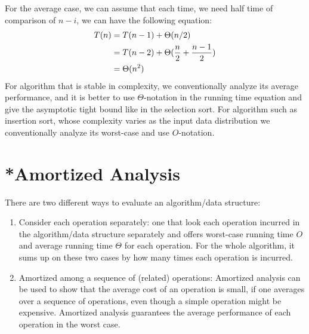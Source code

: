 \documentclass[../main.tex]{subfiles}
\begin{document}
For the average case, we can assume that each time, we need half time of comparison of $n-i$, we can have the following equation:
\begin{align}
    T(n)&=T(n-1)+\Theta(n/2)\\
    &=T(n-2)+\Theta(\frac{n}{2}+\frac{n-1}{2}) \notag\\
    &=\Theta(n^2)\notag
\end{align}
For algorithm that is stable in complexity, we conventionally analyze its average performance, and it is better to use $\Theta$-notation in the running time equation and give the asymptotic tight bound like in the selection sort. For algorithm such as insertion sort, whose complexity varies as the input data distribution we conventionally analyze its worst-case and use $O$-notation.





\section{*Amortized Analysis}
\label{sec_amortized_analysis}
There are two different ways to evaluate an algorithm/data structure: 

\begin{enumerate}
    \item Consider each operation separately: one that look each operation incurred in the algorithm/data structure separately and offers worst-case running time $O$ and average running time $\Theta$ for each operation. For the whole algorithm, it sums up on these two cases by how many times each operation is incurred.
    \item Amortized among a sequence of (related) operations: Amortized analysis can be used to show that the average cost of an operation is small, if one averages over a sequence of operations, even though a simple operation might be expensive. Amortized analysis guarantees the average performance of each operation in the worst case. 
\end{enumerate}
\end{document}
